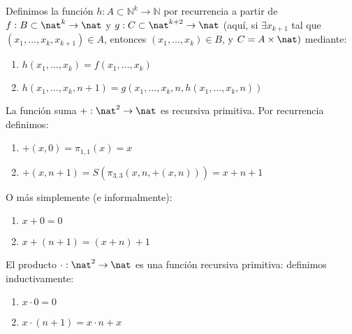 \begin{defn}
	Definimos la función $h:A\subset\mathbb{N}^k\to\mathbb{N}$ por recurrencia a partir de $f:B\subset\nat^k\to \nat$ y $g:C\subset\nat^{k+2}\to\nat$ (aquí, si $\exists x_{k+1}$ tal que $(x_1, \hdots, x_k, x_{k+1})\in A$, entonces $(x_1, \hdots, x_k)\in B$, y $C=A\times\nat)$ mediante:
	\begin{enumerate}
		\item $h(x_1,\hdots, x_k)=f(x_1, \hdots, x_k)$
		\item $h(x_1, \hdots, x_{k}, n+1) = g(x_1, \hdots, x_k,n,h(x_1,\hdots, x_k, n))$
	\end{enumerate}
\end{defn}

\begin{example}
	La función suma $+:\nat^2\to\nat$ es  recursiva primitiva. Por recurrencia definimos:
	\begin{enumerate}
		\item $+(x,0) = \pi_{1,1}(x) = x$
		\item $+(x,n+1) =  S(\pi_{3,3}(x,n,+(x,n))) = x+n+1$
	\end{enumerate}
\end{example}

O más simplemente (e informalmente):
\begin{enumerate}
	\item $x+0 = 0$
	\item $x+(n+1) = (x+n) +1$
\end{enumerate}
\begin{example}
	El producto $\cdot:\nat^2\to \nat$ es una función recursiva primitiva: definimos inductivamente:
	\begin{enumerate}
		\item $x\cdot 0 = 0$
		\item $x\cdot(n+1) = x\cdot n + x$
	\end{enumerate}
\end{example}



